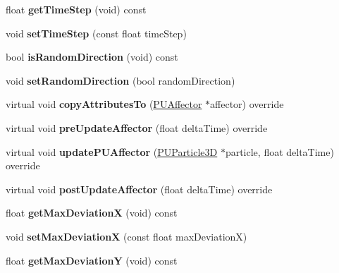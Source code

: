 \begin{DoxyCompactItemize}
float {\bfseries get\+Time\+Step} (void) const
\item 
\mbox{\label{classPURandomiser_abcb3ef96b71f590448474fbe43b955a7}} 
void {\bfseries set\+Time\+Step} (const float time\+Step)
\item 
\mbox{\label{classPURandomiser_a2520aaa7282011388f23e74eeac2f55c}} 
bool {\bfseries is\+Random\+Direction} (void) const
\item 
\mbox{\label{classPURandomiser_a9ff43fcc0606439cdc50f446b395db60}} 
void {\bfseries set\+Random\+Direction} (bool random\+Direction)
\item 
\mbox{\label{classPURandomiser_a547ff4e3e5e59e588b7f69d4120f97e5}} 
virtual void {\bfseries copy\+Attributes\+To} (\hyperlink{classPUAffector}{P\+U\+Affector} $\ast$affector) override
\item 
\mbox{\label{classPURandomiser_a41f86a2a0b20a1a6993a5e85673191fb}} 
virtual void {\bfseries pre\+Update\+Affector} (float delta\+Time) override
\item 
\mbox{\label{classPURandomiser_afdb962758b5d8d472c623750b0f1436c}} 
virtual void {\bfseries update\+P\+U\+Affector} (\hyperlink{structPUParticle3D}{P\+U\+Particle3D} $\ast$particle, float delta\+Time) override
\item 
\mbox{\label{classPURandomiser_a69b0e71d5c44f8bb427d1d93c2a92d6f}} 
virtual void {\bfseries post\+Update\+Affector} (float delta\+Time) override
\item 
\mbox{\label{classPURandomiser_a2dccc246da4fcc85f8a005a178461ce0}} 
float {\bfseries get\+Max\+DeviationX} (void) const
\item 
\mbox{\label{classPURandomiser_a100768cb547e6ad92c45e8c021c97fd9}} 
void {\bfseries set\+Max\+DeviationX} (const float max\+DeviationX)
\item 
\mbox{\label{classPURandomiser_a49ab41c165a40c79e58c5cbefa869453}} 
float {\bfseries get\+Max\+DeviationY} (void) const

\end{DoxyCompactItemize}
